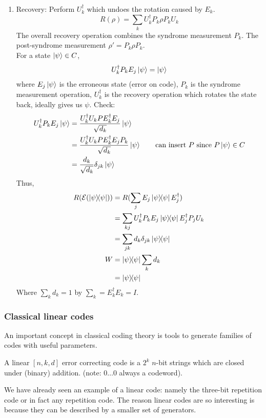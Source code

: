 \begin{enumerate}
    \item Recovery: Perform $U_k^\dagger$ which undoes the rotation caused by $E_k$. 
    \begin{equation}
        R(\rho) = \sum_k U_k^\dagger P_k \rho P_k U_k
    \end{equation}
    The overall recovery operation combines the syndrome measurement $P_k$. The post-syndrome measurement $\rho'= P_k\rho P_k$. \\
    For a state $\ket{\psi} \in C$, 
    \begin{equation}
        U_k^\dagger P_kE_j \ket{\psi} = \ket{\psi}
    \end{equation}
     where $E_j\ket{\psi}$ is the erroneous state (error on code), $P_k$ is the syndrome measurement operation, $U_k^\dagger$ is the recovery operation which rotates the state back, ideally gives us $\psi$. Check:
     \begin{align}
         U_k^\dagger P_kE_j \ket{\psi} &= \frac{U_k^\dagger U_k P E_k^\dagger E_j}{\sqrt{d_k}} \ket{\psi} \\
         &= \frac{U_k^\dagger U_k P E_k^\dagger E_jP_k}{\sqrt{d_k}} \ket{\psi} \qquad \text{can insert $P$ since $P\ket{\psi} \in C$} \\ 
         &= \frac{d_k}{\sqrt{d_k}} \delta_{jk} \ket{\psi}
     \end{align}
     Thus,
     \begin{align}
         R(\mathcal{E}(\ketbra{\psi})) &= R(\sum_j E_j \ketbra{\psi}E_j^\dagger) \\
         &= \sum_{kj} U_k^\dagger P_kE_j \ketbra{\psi} E_j^\dagger P_jU_k \\
         &=\sum_{jk}d_k \delta_{jk} \ketbra{\psi} \\W
         &= \ketbra{\psi}\sum_k d_k \\
         &= \ketbra{\psi}
     \end{align}
    Where $\sum_k d_k = 1$ by $\sum_k = E_k^\dagger E_k = I$. 
\end{enumerate}


\subsubsection{Classical linear codes}
An important concept in classical coding theory is tools to generate families of codes with useful parameters. 
\begin{definition}
    A linear $[n,k,d]$ error correcting code is a $2^k$ $n$-bit strings which are closed under (binary) addition. (note: $0\dots0$ always a codeword). 
\end{definition}
We have already seen an example of a linear code: namely the three-bit repetition code or in fact any repetition code. The reason linear codes are so interesting is because they can be described by a smaller set of generators. 

